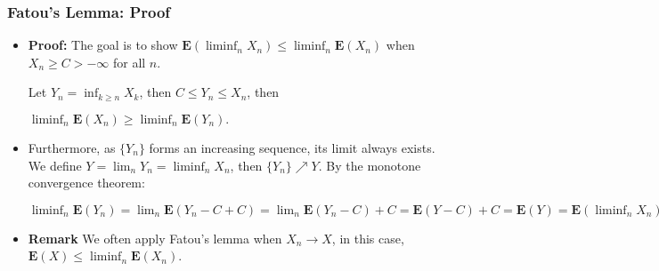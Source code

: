 \documentclass[handout]{beamer}
\newcommand{\BE}{\mathbf{E}}
\begin{document}
\frame
{
  \frametitle{Fatou's Lemma: Proof} 

   \begin{itemize}
   


                
                               \item<1-> \textbf{Proof:} The goal is to show $\BE(\liminf_n X_n)\leq \liminf_n \BE(X_n) $ when $X_n\geq C>-\infty$ for all $n$. 
            
                               
                               
                               Let $Y_n=\inf_{k\geq n} X_k$, then $C\leq Y_n\leq X_n$, then
                               
                               $ \liminf_n \BE(X_n) \geq \liminf_n \BE(Y_n).$
                               
                             \item<3->[-] Furthermore, as $\{Y_n\}$ forms an increasing sequence, its limit always exists. We define $Y=\lim_n Y_n=\liminf_n X_n$, then $\{Y_n\} \nearrow Y$.  By the monotone convergence theorem:
                             
                                                            $ \liminf_n \BE(Y_n)=\lim_n \BE(Y_n-C+C)=\lim_n \BE(Y_n-C)+C= \BE(Y-C)+C=\BE(Y) = \BE(\liminf_n X_n).$
                                                            
                                                            
                             \item<4->\textbf{Remark} We often apply Fatou's lemma when $X_n\rightarrow X$, in this case, $\BE(X)\leq \liminf_n \BE(X_n) $.
                              \end{itemize}
}
\end{document}
